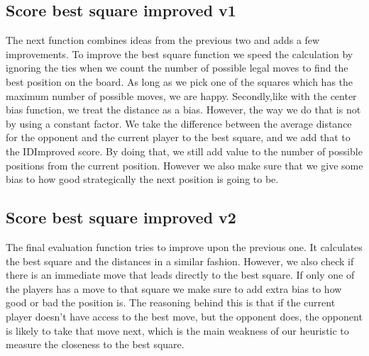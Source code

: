 \documentclass{article}
\begin{document}
\subsection{Score best square improved v1}
The next function combines ideas from the previous two and adds a few improvements. To improve the best square function we speed the calculation by ignoring the ties when we count the number of possible legal moves to find the best position on the board. As long as we pick one of the squares which has the maximum number of possible moves, we are happy. Secondly,like with the center bias function, we treat the distance as a bias. However, the way we do that is not by using a constant factor. We take the difference between the average distance for the opponent and the current player to the best square, and we add that to the IDImproved score. By doing that, we still add value to the number of possible positions from the current position. However we also make sure that we give some bias to how good strategically the next position is going to be. 
\subsection{Score best square improved v2}
The final evaluation function tries to improve upon the previous one. It calculates the best square and the distances in a similar fashion. However, we also check if there is an immediate move that leads directly to the best square. If only one of the players has a move to that square we make sure to add extra bias to how good or bad the position is. The reasoning behind this is that if the current player doesn't have access to the best move, but the opponent does, the opponent is likely to take that move next, which is the main weakness of our heuristic to measure the closeness to the best square.
\end{document}
